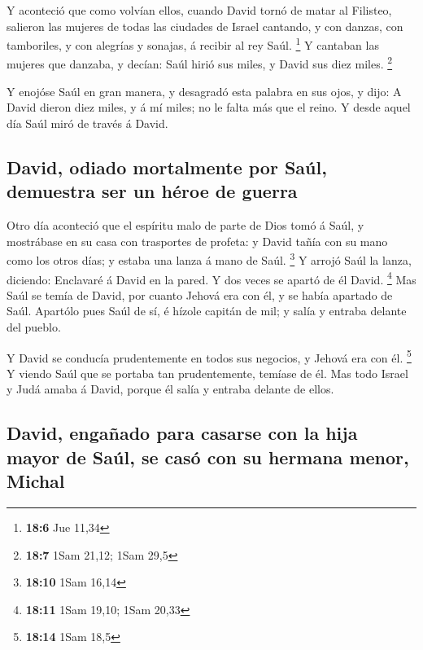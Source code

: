  Y aconteció que como volvían ellos, cuando David tornó de
matar al Filisteo, salieron las mujeres de todas las ciudades de Israel
cantando, y con danzas, con tamboriles, y con alegrías y sonajas, á
recibir al rey Saúl. \footnote{\textbf{18:6} Jue 11,34}  Y
cantaban las mujeres que danzaba, y decían: Saúl hirió sus miles, y
David sus diez miles. \footnote{\textbf{18:7} 1Sam 21,12; 1Sam 29,5}

 Y enojóse Saúl en gran manera, y desagradó esta palabra
en sus ojos, y dijo: A David dieron diez miles, y á mí miles; no le
falta más que el reino.  Y desde aquel día Saúl miró de
través á David.

\hypertarget{david-odiado-mortalmente-por-sauxfal-demuestra-ser-un-huxe9roe-de-guerra}{%
\subsection{David, odiado mortalmente por Saúl, demuestra ser un héroe
de
guerra}\label{david-odiado-mortalmente-por-sauxfal-demuestra-ser-un-huxe9roe-de-guerra}}

 Otro día aconteció que el espíritu malo de parte de Dios
tomó á Saúl, y mostrábase en su casa con trasportes de profeta: y David
tañía con su mano como los otros días; y estaba una lanza á mano de
Saúl. \footnote{\textbf{18:10} 1Sam 16,14}  Y arrojó Saúl
la lanza, diciendo: Enclavaré á David en la pared. Y dos veces se apartó
de él David. \footnote{\textbf{18:11} 1Sam 19,10; 1Sam 20,33}
 Mas Saúl se temía de David, por cuanto Jehová era con
él, y se había apartado de Saúl.  Apartólo pues Saúl de
sí, é hízole capitán de mil; y salía y entraba delante del pueblo.

 Y David se conducía prudentemente en todos sus negocios,
y Jehová era con él. \footnote{\textbf{18:14} 1Sam 18,5} 
Y viendo Saúl que se portaba tan prudentemente, temíase de él.
 Mas todo Israel y Judá amaba á David, porque él salía y
entraba delante de ellos.

\hypertarget{david-engauxf1ado-para-casarse-con-la-hija-mayor-de-sauxfal-se-casuxf3-con-su-hermana-menor-michal}{%
\subsection{David, engañado para casarse con la hija mayor de Saúl, se
casó con su hermana menor,
Michal}\label{david-engauxf1ado-para-casarse-con-la-hija-mayor-de-sauxfal-se-casuxf3-con-su-hermana-menor-michal}}


